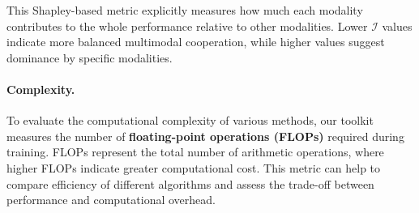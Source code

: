 This Shapley-based metric explicitly measures how much each modality contributes to the whole performance relative to other modalities. Lower $\mathcal{I}$ values indicate more balanced multimodal cooperation, while higher values suggest dominance by specific modalities. 


\paragraph{Complexity.} To evaluate the computational complexity of various methods, our toolkit measures the number of \textbf{floating-point operations (FLOPs)} required during training. FLOPs represent the total number of arithmetic operations, where higher FLOPs indicate greater computational cost. This metric can help to compare efficiency of different algorithms and assess the trade-off between performance and computational overhead.

